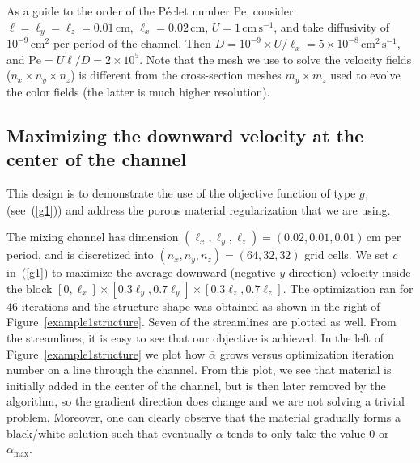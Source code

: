 \documentclass[times]{fldauth}
\begin{document}
As a guide to the order of the P\'{e}clet number $\text{Pe}$, consider
$\ell=\ell_y=\ell_z=0.01\,\text{cm}$, $\ell_x =0.02 \,\text{cm}$, $U=1
\, \text{cm} \, \text{s}^{-1}$, and take diffusivity of
$10^{-9}\,\text{cm}^2$ per period of the channel. Then $D =
10^{-9}\times U/\ell_x = 5\times10^{-8}\,\text{cm}^2\,\text{s}^{-1}$,
and $\text{Pe} = U\ell/D = 2\times10^5$. Note that the mesh we use to
solve the velocity fields ($n_x \times n_y \times n_z$) is different
from the cross-section meshes $m_y \times m_z$ used to evolve the
color fields (the latter is much higher resolution).


\subsection{Maximizing the downward velocity at the center of the channel}
\label{sec:maxim-downw-veloc}

This design is to demonstrate the use of the objective function of
type $g_1$ (see~(\ref{g1})) and address the porous material
regularization that we are using.

The mixing channel has dimension $(\ell_x,\ell_y,\ell_z) =
(0.02,0.01,0.01)\,$cm per period, and is discretized into
$(n_x,n_y,n_z)=(64,32,32)$ grid cells. We set $\bar{c}$ in~(\ref{g1})
to maximize the average downward (negative $y$ direction) velocity
inside the block $[0,\ell_x] \times [0.3\ell_y,0.7\ell_y] \times
[0.3\ell_z,0.7\ell_z]$. The optimization ran for $46$ iterations and
the structure shape was obtained as shown in the right of
Figure~\ref{example1structure}. Seven of the streamlines are plotted
as well. From the streamlines, it is easy to see that our objective is
achieved. In the left of Figure~\ref{example1structure} we plot how
$\bar{\alpha}$ grows versus optimization iteration number on a line
through the channel. From this plot, we see that material is initially
added in the center of the channel, but is then later removed by the
algorithm, so the gradient direction does change and we are not
solving a trivial problem. Moreover, one can clearly observe that the
material gradually forms a black/white solution such that eventually
$\bar{\alpha}$ tends to only take the value $0$ or
$\alpha_\text{max}$.
\end{document}
